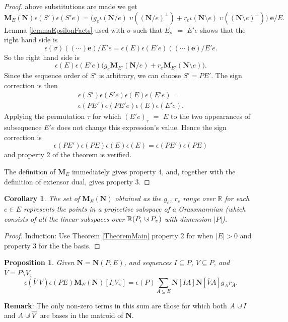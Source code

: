 \documentclass[12pt]{article}
\newtheorem{proposition}[theorem]{Proposition}
\newtheorem{corollary}[theorem]{Corollary}
\theoremstyle{definition}
\newcommand{\Remark}{\textbf{Remark}}
\newcommand{\dunion}
{\mbox{\hbox{\hskip6pt$\cdot$\hskip-5.50pt$\cup$\hskip2pt}}}
\newcommand{\scomp}[1]{\ensuremath{\overline{#1}}}
\newcommand{\scma}{\ensuremath{\ }}
\newcommand{\Is}{\ensuremath{\iota}}
\newcommand{\Vs}{\ensuremath{\upsilon}}
\newcommand{\Reals}{\ensuremath{\mathbb{R}}}
\newcommand{\Card}[1]{\ensuremath{{\left|#1\right|}}}
\newcommand{\ext}[1]{\ensuremath{\mathbf{#1}}}
\begin{document}
\begin{proof}
above substitutions are made we get
\[
\ext{M}_E(\ext{N})\epsilon(S')\epsilon(S'e) =
\big(g_e \Is(\ext{N}/e)\;\Vs((\ext{N}/e)^\perp)+
r_e\Is(\ext{N}\setminus e)\;\Vs((\ext{N}\setminus e)^\perp)\big)\;\ext{e}/E.
\]
Lemma \ref{lemmaEpsilonFacts} used with $\sigma$ such that
$E_\sigma$ $=$ $E'e$ shows that the right hand side is
\[
\epsilon(\sigma)((\cdots)\ext{e})/E'e = 
\epsilon(E)\epsilon(E'e)((\cdots)\ext{e})/E'e.
\]
So the right hand side is
\[
\epsilon(E)\epsilon(E'e)\big(g_e\ext{M}_{E'}(\ext{N}/e)+r_e\ext{M}_{E'}(\ext{N}\setminus e)\big).
\]
Since the sequence order of $S'$ is arbitrary, we can choose $S'=PE'$.  The sign correction is then
\begin{equation*}
\begin{split}
\epsilon(S')\epsilon(S'e)\epsilon(E)\epsilon(E'e)=\\
\epsilon(PE')\epsilon(PE'e)\epsilon(E)\epsilon(E'e).
\end{split}
\end{equation*}
Applying the permutation $\tau$ for which $(E'e)_\tau$ $=$ $E$ to the two
appearances of subsequence $E'e$ does not change this expression's value. 
Hence the sign correction is
\[
\epsilon(PE')\epsilon(PE)\epsilon(E)\epsilon(E)=\epsilon(PE')\epsilon(PE)
\]
and property 2 of the theorem is verified.

The definition of $\ext{M}_E$ immediately gives property 4, and, together
with the definition of extensor dual, gives property 3.
\end{proof}


\begin{corollary}
The set of $\ext{M}_E(\ext{N})$ 
obtained as the $g_e$, $r_e$ range over $\Reals$ for
each $e\in E$ represents the points in a 
projective subspace of a Grassmannian 
(which consists of all the
linear subspaces over $\Reals (P_{\Is}\dunion P_{\Vs})$ 
with 
dimension $\Card{P}$).
\end{corollary}


\begin{proof}
Induction: Use Theorem \ref{TheoremMain} property 2 for when $|E|>0$ and 
property 3
for the the basis.
\end{proof}

\begin{proposition}Given $\ext{N}=\ext{N}(P,E)$,
and sequences $I\subseteq P$, $V\subseteq P$, and $\scomp{V}=P\setminus V$,
\label{PairsPropositionMain}
\[
\epsilon(\scomp{V}\scma V)\epsilon(PE)\ext{M}_E(\ext{N})[I_{\Is}V_{\Vs}] = 
\epsilon(P)\sum_{A\subseteq E}\ext{N}[IA]\ext{N}
[\scomp{V}A]g_Ar_{\scomp{A}}.
\]
\end{proposition}
\Remark: The only non-zero terms in this sum are those for which both $A\dunion I$
and $A\dunion \scomp{V}$ are bases in the matroid of $\ext{N}$.
\end{document}
